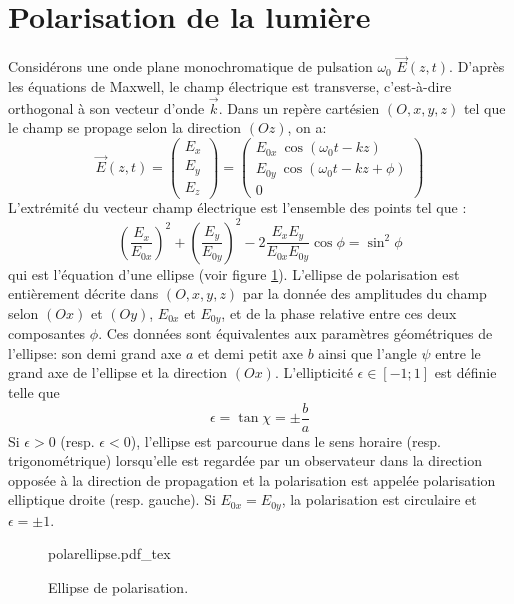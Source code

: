 \section{Polarisation de la lumière}
Considérons une onde plane monochromatique de pulsation $\omega_0$ $\vec{E}(z,t)$. D'après les équations de Maxwell, le champ électrique est transverse, c'est-à-dire orthogonal à son vecteur d'onde $\vec{k}$. Dans un repère cartésien $(O,x,y,z)$ tel que le champ se propage selon la direction $(Oz)$, on a:
\begin{equation}
\vec{E}(z,t) = \begin{pmatrix}
E_x \\
E_y\\
E_z
\end{pmatrix} =
\begin{pmatrix}
E_{0x} \: \cos(\omega_0 t - k z) \\
E_{0y} \: \cos(\omega_0 t - k z + \phi)  \\
0
\end{pmatrix}
\end{equation}
L'extrémité du vecteur champ électrique est l'ensemble des points tel que : 
\begin{equation}
\left(\frac{E_x}{E_{0x}}\right)^2 + \left(\frac{E_y}{E_{0y}}\right)^2 - 2 \frac{E_x E_y}{E_{0x} E_{0y}} \cos \phi = \sin^2 \phi
\end{equation}
qui est l'équation d'une ellipse (voir figure \ref{fig:Polarellipse}). L'ellipse de polarisation est entièrement décrite dans $(O,x,y,z)$ par la donnée des amplitudes du champ selon $(Ox)$ et $(Oy)$, $E_{0x}$ et $E_{0y}$, et de la phase relative entre ces deux composantes $\phi$. Ces données sont équivalentes aux paramètres géométriques de l'ellipse: son demi grand axe $a$ et demi petit axe $b$ ainsi que l'angle $\psi$ entre le grand axe de l'ellipse et la direction $(Ox)$. L'ellipticité $\epsilon \in [-1; 1]$ est définie telle que 
\begin{equation}
\epsilon = \tan \chi = \pm \frac{b}{a}
\end{equation}
Si $\epsilon > 0$ (resp. $\epsilon <0$), l'ellipse est parcourue dans le sens horaire (resp. trigonométrique) lorsqu'elle est regardée par un observateur dans la direction opposée à la direction de propagation et la polarisation est appelée polarisation elliptique droite (resp. gauche). Si $E_{0x} = E_{0y}$, la polarisation est circulaire et $\epsilon = \pm 1$.

\begin{figure}
\centering
\def\svgwidth{0.7\textwidth}
{polarellipse.pdf_tex}
\caption{Ellipse de polarisation.}
\label{fig:Polarellipse}
\end{figure}


